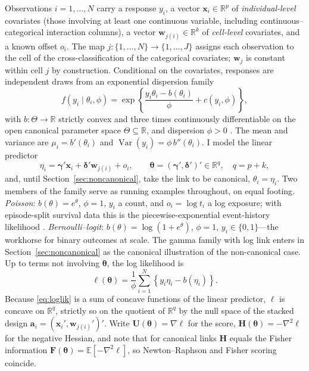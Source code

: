 \documentclass[11pt]{article}
\newcommand{\R}{\mathbb{R}}
\newcommand{\E}{\mathbb{E}}
\newcommand{\Var}{\operatorname{Var}}
\newcommand{\bgamma}{\bm{\gamma}}
\newcommand{\bdelta}{\bm{\delta}}
\newcommand{\btheta}{\bm{\theta}}
\newcommand{\bx}{\mathbf{x}}
\newcommand{\bw}{\mathbf{w}}
\newcommand{\ba}{\mathbf{a}}
\newcommand{\bH}{\mathbf{H}}
\newcommand{\bF}{\mathbf{F}}
\newcommand{\bU}{\mathbf{U}}
\begin{document}
Observations $i = 1, \dots, N$ carry a response $y_i$, a vector
$\bx_i \in \R^{p}$ of \emph{individual-level} covariates (those involving
at least one continuous variable, including continuous--categorical
interaction columns), a vector $\bw_{j(i)} \in \R^{k}$ of
\emph{cell-level} covariates, and a known offset $o_i$.  The map
$j : \{1,\dots,N\} \to \{1,\dots,J\}$ assigns each observation to the
cell of the cross-classification of the categorical covariates;
$\bw_j$ is constant within cell $j$ by construction.  Conditional on the
covariates, responses are independent draws from an exponential
dispersion family
\begin{equation}\label{eq:edf}
f(y_i \mid \theta_i, \phi)
  = \exp\!\left\{ \frac{y_i \theta_i - b(\theta_i)}{\phi}
      + c(y_i, \phi) \right\},
\end{equation}
with $b : \Theta \to \R$ strictly convex and three times continuously
differentiable on the open canonical parameter space $\Theta \subseteq \R$,
and dispersion $\phi > 0$
\citep{nelder1972,jorgensen1987,mccullagh1989}.  The mean and variance
are $\mu_i = b'(\theta_i)$ and $\Var(y_i) = \phi\, b''(\theta_i)$.  I
model the linear predictor
\begin{equation}\label{eq:linpred}
\eta_i = \bgamma' \bx_i + \bdelta' \bw_{j(i)} + o_i,
\qquad \btheta = (\bgamma', \bdelta')' \in \R^{q}, \quad q = p + k,
\end{equation}
and, until Section~\ref{sec:noncanonical}, take the link to be canonical,
$\theta_i = \eta_i$.  Two members of the family serve as running
examples throughout, on equal footing.  \emph{Poisson}:
$b(\theta) = e^{\theta}$, $\phi = 1$, $y_i$ a count, and
$o_i = \log t_i$ a log exposure; with episode-split survival data this
is the piecewise-exponential event-history likelihood
\citep{holford1980,aitkin1980,andersen1993}.  \emph{Bernoulli--logit}:
$b(\theta) = \log(1 + e^{\theta})$, $\phi = 1$, $y_i \in \{0, 1\}$---the
workhorse for binary outcomes at scale.  The gamma family with log link
enters in Section~\ref{sec:noncanonical} as the canonical illustration
of the non-canonical case.  Up to terms not involving $\btheta$, the
log likelihood is
\begin{equation}\label{eq:loglik}
\ell(\btheta)
  = \frac{1}{\phi} \sum_{i=1}^{N}
      \left\{ y_i \eta_i - b(\eta_i) \right\}.
\end{equation}
Because \eqref{eq:loglik} is a sum of concave functions of the linear
predictor, $\ell$ is concave on $\R^q$, strictly so on the quotient of
$\R^q$ by the null space of the stacked design
$\ba_i = (\bx_i', \bw_{j(i)}')'$.  Write
$\bU(\btheta) = \nabla \ell$ for the score,
$\bH(\btheta) = -\nabla^2 \ell$ for the negative Hessian, and note that
for canonical links $\bH$ equals the Fisher information
$\bF(\btheta) = \E[-\nabla^2 \ell]$, so Newton--Raphson and Fisher scoring
coincide.
\end{document}
